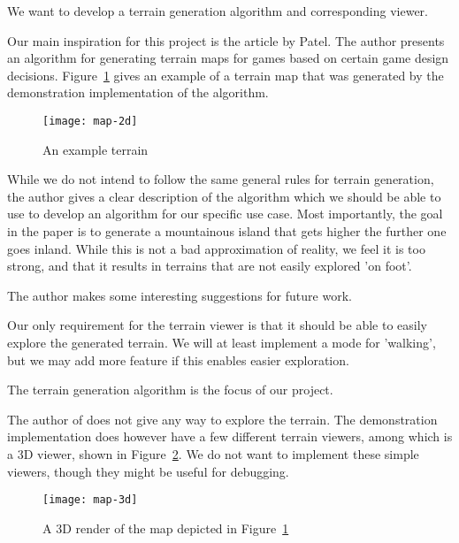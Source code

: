 We want to develop a terrain generation algorithm and corresponding viewer. 

Our main inspiration for this project is the article by Patel\cite{redblob}.
The author presents an algorithm for generating terrain maps for games based on certain game design decisions.
Figure~\ref{fig:map-2d} gives an example of a terrain map that was generated by the demonstration implementation of the algorithm.

\begin{figure}[h]
	\centering
	\texttt{[image: map-2d]}
	\caption{An example terrain}
	\label{fig:map-2d}
\end{figure}

While we do not intend to follow the same general rules for terrain generation, the author gives a clear description of the algorithm which we should be able to use to develop an algorithm for our specific use case.
Most importantly, the goal in the paper is to generate a mountainous island that gets higher the further one goes inland.
While this is not a bad approximation of reality, we feel it is too strong, and that it results in terrains that are not easily explored 'on foot'.

The author makes some interesting suggestions for future work.

Our only requirement for the terrain viewer is that it should be able to easily explore the generated terrain.
We will at least implement a mode for 'walking', but we may add more feature if this enables easier exploration.

The terrain generation algorithm is the focus of our project.

The author of \cite{redblob} does not give any way to explore the terrain.
The demonstration implementation does however have a few different terrain viewers, among which is a 3D viewer, shown in Figure~\ref{fig:map-3d}.
We do not want to implement these simple viewers, though they might be useful for debugging.

\begin{figure}[h]
	\centering
	\texttt{[image: map-3d]}
	\caption{A 3D render of the map depicted in Figure~\ref{fig:map-2d}}
	\label{fig:map-3d}
\end{figure}
